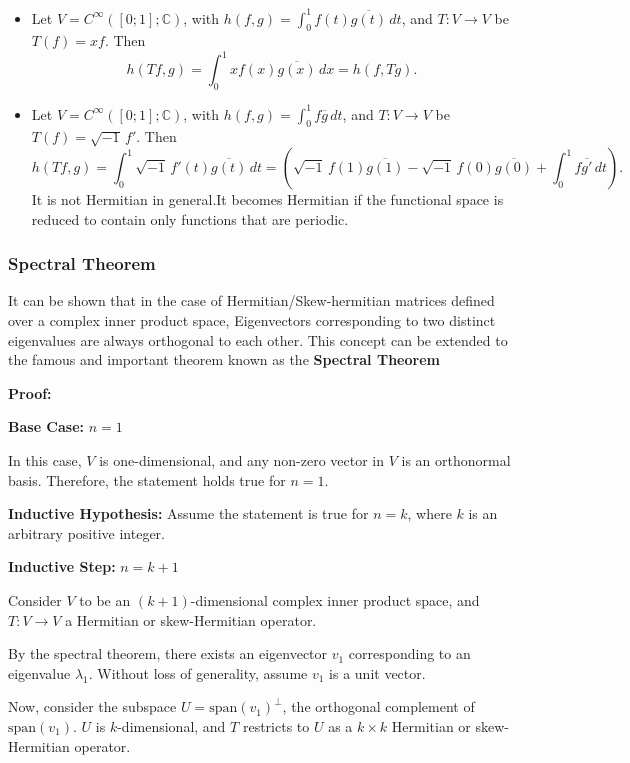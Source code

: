 \begin{itemize}
    \item Let $V = C^\infty([0; 1];\mathbb{C})$, with $h(f, g) = \int_{0}^{1} f(t)\overline{g(t)} \,dt$, and
$T: V \to V$ be $T(f) = xf$. Then
\[
h(Tf, g) = \int_{0}^{1} xf(x)\overline{g(x)} \,dx = h(f, Tg).
\]

\item 
Let $V = C^\infty([0; 1];\mathbb{C})$, with $h(f, g) = \int_{0}^{1} f\overline{g} \,dt$, and
$T: V \to V$ be $T(f) = \sqrt{-1}\,f'$. Then
\[
h(Tf, g) = \int_{0}^{1} \sqrt{-1}\,f'(t)\overline{g(t)} \,dt = \left(\sqrt{-1}\,f(1)\overline{g(1)} - \sqrt{-1}\,f(0)\overline{g(0)} + \int_{0}^{1} f\overline{g'} \,dt\right).
\] 
It is not Hermitian in general.It becomes Hermitian if the functional space is reduced to contain only functions that are periodic. 
\end{itemize}


\subsubsection{Spectral Theorem}

It can be shown that in the case of Hermitian/Skew-hermitian matrices defined over a complex inner product space, Eigenvectors corresponding to two distinct eigenvalues are always orthogonal to each other. This concept can be extended to the famous and important theorem known as the \textbf{Spectral Theorem}

\textbf{Proof:}

\textbf{Base Case:} \(n = 1\)

In this case, \(V\) is one-dimensional, and any non-zero vector in \(V\) is an orthonormal basis. Therefore, the statement holds true for \(n = 1\).

\textbf{Inductive Hypothesis:} Assume the statement is true for \(n = k\), where \(k\) is an arbitrary positive integer.

\textbf{Inductive Step:} \(n = k + 1\)

Consider \(V\) to be an \((k+1)\)-dimensional complex inner product space, and \(T: V \rightarrow V\) a Hermitian or skew-Hermitian operator.

By the spectral theorem, there exists an eigenvector \(v_1\) corresponding to an eigenvalue \(\lambda_1\). Without loss of generality, assume \(v_1\) is a unit vector.

Now, consider the subspace \(U = \text{span}(v_1)^\perp\), the orthogonal complement of \(\text{span}(v_1)\). \(U\) is \(k\)-dimensional, and \(T\) restricts to \(U\) as a \(k \times k\) Hermitian or skew-Hermitian operator.


